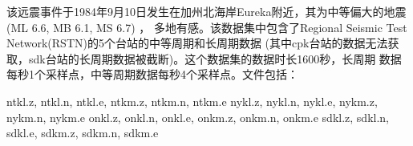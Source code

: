 该远震事件于1984年9月10日发生在加州北海岸Eureka附近，其为中等偏大的地震(ML 6.6, MB 6.1, MS 6.7) ，
多地有感。该数据集中包含了Regional Seismic Test Network(RSTN)的5个台站的中等周期和长周期数据
(其中cpk台站的数据无法获取，sdk台站的长周期数据被截断)。这个数据集的数据时长1600秒，长周期
数据每秒1个采样点，中等周期数据每秒4个采样点。文件包括：
\begin{SACCode}
    ntkl.z, ntkl.n, ntkl.e, ntkm.z, ntkm.n, ntkm.e
    nykl.z, nykl.n, nykl.e, nykm.z, nykm.n, nykm.e
    onkl.z, onkl.n, onkl.e, onkm.z, onkm.n, onkm.e
    sdkl.z, sdkl.n, sdkl.e, sdkm.z, sdkm.n, sdkm.e
\end{SACCode}
